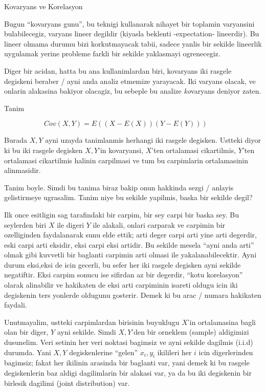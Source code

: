 \documentclass[12pt,fleqn]{article}\usepackage{../common}
\begin{document}
Kovaryans ve Korelasyon

Bugun ``kovaryans gunu'', bu teknigi kullanarak nihayet bir toplamin
varyansini bulabilecegiz, varyans lineer degildir (kiyasla beklenti
-expectation- lineerdir). Bu lineer olmama durumu bizi korkutmayacak tabii,
sadece yanlis bir sekilde lineerlik uygulamak yerine probleme farkli bir
sekilde yaklasmayi ogrenecegiz. 

Diger bir acidan, hatta bu ana kullanimlardan biri, kovaryans iki rasgele
degiskeni beraber / ayni anda analiz etmemize yarayacak. Iki varyans
olacak, ve onlarin alakasina bakiyor olacagiz, bu sebeple bu analize {\em
  ko}varyans deniyor zaten. 

Tanim

$$ Cov(X,Y) = E((X-E(X))(Y-E(Y))) \hspace{2em} \label{1} $$

Burada $X,Y$ ayni uzayda tanimlanmis herhangi iki rasgele degisken. Ustteki
diyor ki bu iki rasgele degisken $X,Y$'in kovaryansi, $X$'ten ortalamasi
cikartilmis, $Y$'ten ortalamasi cikartilmis halinin carpilmasi ve tum bu
carpimlarin ortalamasinin alinmasidir.

Tanim boyle. Simdi bu tanima biraz bakip onun hakkinda sezgi / anlayis
gelistirmeye ugrasalim. Tanim niye bu sekilde yapilmis, baska bir sekilde
degil?

Ilk once esitligin sag tarafindaki bir carpim, bir sey carpi bir baska
sey. Bu seylerden biri $X$ ile digeri $Y$ ile alakali, onlari carparak ve
carpimin bir ozelliginden faydalanarak sunu elde ettik; arti deger carpi
arti yine arti degerdir, eski carpi arti eksidir, eksi carpi eksi
artidir. Bu sekilde mesela ``ayni anda arti'' olmak gibi kuvvetli bir
baglanti carpimin arti olmasi ile yakalanabilecektir. Ayni durum eksi,eksi
de icin gecerli, bu sefer her iki rasgele degisken ayni sekilde
negatiftir. Eksi carpim sonucu ise sifirdan az bir degerdir, ``kotu
korelasyon'' olarak alinabilir ve hakikaten de eksi arti carpiminin isareti
oldugu icin iki degiskenin ters yonlerde oldugunu gosterir. Demek ki bu
arac / numara hakikaten faydali. 

Unutmayalim, ustteki carpimlardan birisinin buyuklugu $X$'in ortalamasina
bagli olan bir diger, $Y$ ayni sekilde. Simdi $X,Y$'den bir orneklem
(sample) aldigimizi dusunelim. Veri setinin her veri noktasi bagimsiz ve
ayni sekilde dagilmis (i.i.d) durumda. Yani $X,Y$ degiskenlerine ``gelen''
$x_i,y_i$ ikilileri her $i$ icin digerlerinden bagimsiz; fakat her ikilinin
arasinda bir baglanti var, yani demek ki bu rasgele degiskenlerin baz
aldigi dagilimlarin bir alakasi var, ya da bu iki degiskenin bir birlesik
dagilimi (joint distribution) var.
\end{document}
